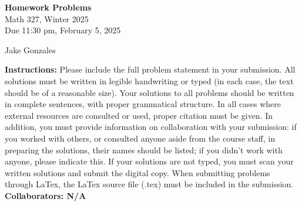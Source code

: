 \documentclass [10pt]{article}
\newcommand{\jg}[1]{{\color{blue} #1}}
\begin{document}
\begin{center}
{\bf Homework Problems}\\
Math 327, Winter 2025\\
Due 11:30 pm, February 5, 2025
\end{center}

\begin{center}
\jg{
    Jake Gonzales}
\end{center}

{\bf Instructions:} Please include the full problem statement in your submission.
All solutions must be written in legible handwriting
or typed (in each case, the text should be of a reasonable size). Your solutions to
all problems should be written in complete sentences, with proper grammatical
structure.
In all cases where external resources are consulted or used, proper citation must
be given. In addition,
you must provide information on collaboration with your submission: if you worked with others,
or consulted anyone aside from the course staff, in preparing the solutions, their
names should be
listed; if you didn't work with anyone, please indicate this.
If your solutions are not typed, you must scan your written solutions and submit
the digital copy. When submitting problems through LaTex, the LaTex source file
(.tex) must be included in the submission. \\

\jg{
\textbf{Collaborators: N/A }
}
\end{document}
